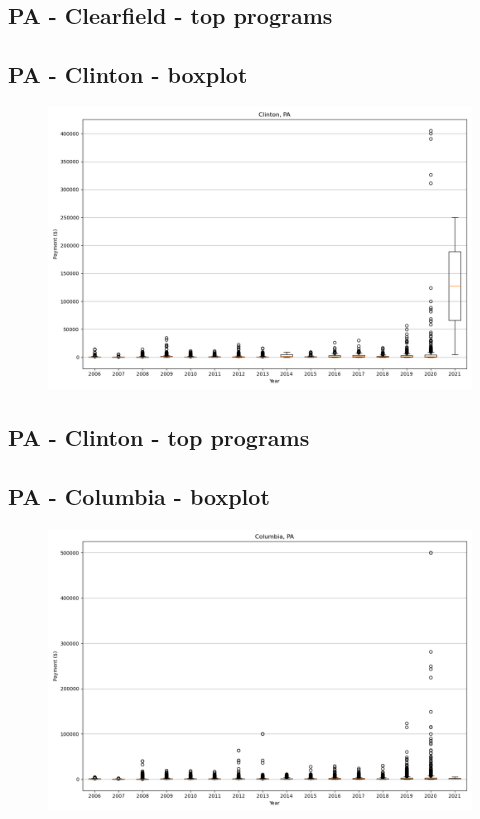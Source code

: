 \subsection*{PA - Clearfield - top programs}

\newpage
\subsection*{PA - Clinton - boxplot}
\begin{figure}[h]
\centering
\includegraphics[width=7in]{../output/boxplots/counties/Clinton-PA_boxplot.png}
\end{figure}


\subsection*{PA - Clinton - top programs}

\newpage
\subsection*{PA - Columbia - boxplot}
\begin{figure}[h]
\centering
\includegraphics[width=7in]{../output/boxplots/counties/Columbia-PA_boxplot.png}
\end{figure}


